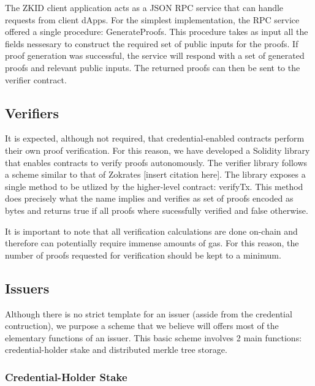 \documentclass[11 pt]{extarticle}
\theoremstyle{remark}
\begin{document}
The ZKID client application acts as a JSON RPC service that can handle requests from client dApps. For the simplest implementation,
the RPC service offered a single procedure: GenerateProofs. This procedure takes as input all the fields nessesary
to construct the required set of public inputs for the proofs. If proof generation was successful, the service will respond with a 
set of generated proofs and relevant public inputs. The returned proofs can then be sent to the verifier contract.  

\subsection{Verifiers}

It is expected, although not required, that credential-enabled contracts perform their own proof verification. For this reason, we have
developed a Solidity library that enables contracts to verify proofs autonomously. The verifier library follows a scheme similar to that
of Zokrates [insert citation here]. The library exposes a single method to be utlized by the higher-level contract: verifyTx. This 
method does precisely what the name implies and verifies as set of proofs encoded as bytes and returns true if all proofs where sucessfully
verified and false otherwise. 

It is important to note that all verification calculations are done on-chain and therefore can potentially require immense amounts of gas.
For this reason, the number of proofs requested for verification should be kept to a minimum. 

\subsection{Issuers}

Although there is no strict template for an issuer (asside from the credential contruction), we purpose a scheme that we believe
will offers most of the elementary functions of an issuer. This basic scheme involves 2 main functions:
credential-holder stake and distributed merkle tree storage.

\subsubsection{Credential-Holder Stake}
\end{document}
